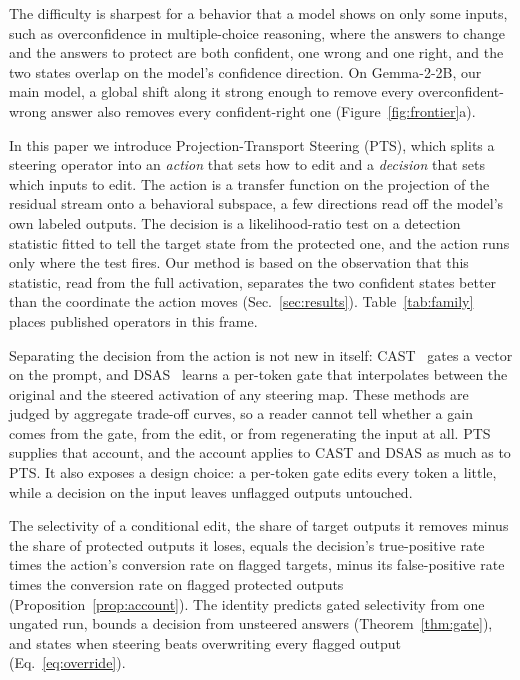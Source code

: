 \documentclass{article}
\begin{document}
The difficulty is sharpest for a behavior that a model shows on only some
inputs, such as overconfidence in multiple-choice reasoning, where the answers
to change and the answers to protect are both confident, one wrong and one
right, and the two states overlap on the model's confidence direction. On
Gemma-2-2B, our main model, a global shift along it strong enough to remove
every overconfident-wrong answer also removes every confident-right one
(Figure~\ref{fig:frontier}a).

In this paper we introduce Projection-Transport Steering (PTS), which splits a
steering operator into an \emph{action} that sets how to edit and a
\emph{decision} that sets which inputs to edit. The action is a transfer
function on the projection of the residual stream onto a behavioral subspace,
a few directions read off the model's own labeled outputs. The decision is a
likelihood-ratio test on a detection statistic fitted to tell the target state
from the protected one, and the action runs only where the test fires. Our
method is based on the observation that this statistic, read from the full
activation, separates the two confident states better than the coordinate the
action moves (Sec.~\ref{sec:results}). Table~\ref{tab:family} places
published operators in this frame.

Separating the decision from the action is not new in itself:
CAST~\citep{lee2024cast} gates a vector on the prompt, and
DSAS~\citep{ferrando2026dsas} learns a per-token gate that interpolates between
the original and the steered activation of any steering map. These methods are
judged by aggregate trade-off curves, so a reader cannot tell whether a gain
comes from the gate, from the edit, or from regenerating the input at all. PTS
supplies that account, and the account applies to CAST and DSAS as much as to
PTS. It also exposes a design choice: a per-token gate edits every token a
little, while a decision on the input leaves unflagged outputs untouched.

The selectivity of a conditional edit, the share of target outputs it
removes minus the share of protected outputs it loses, equals the decision's
true-positive rate times the action's conversion rate on flagged targets,
minus its false-positive rate times the conversion rate on flagged protected
outputs (Proposition~\ref{prop:account}). The identity predicts gated
selectivity from one ungated run, bounds a decision from unsteered answers
(Theorem~\ref{thm:gate}), and states when steering beats overwriting every
flagged output (Eq.~\eqref{eq:override}).
\end{document}
